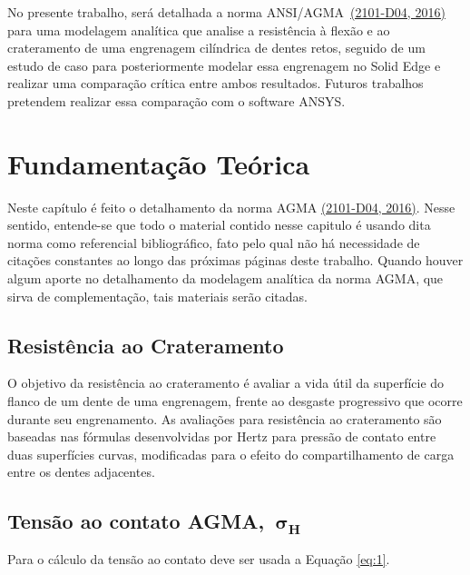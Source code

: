 \documentclass[12pt,a4paper]{article}
\begin{document}
No presente trabalho, será detalhada a norma
ANSI/AGMA~\hyperref[csl:5]{(2101-D04, 2016)} para uma modelagem analítica que analise a
resistência à flexão e ao crateramento de uma engrenagem cilíndrica de
dentes retos, seguido de um estudo de caso para posteriormente modelar
essa engrenagem no Solid Edge e realizar uma comparação crítica entre
ambos resultados. Futuros trabalhos pretendem realizar essa comparação
com o software ANSYS.

\section*{Fundamentação Teórica}

{\label{fundamentauxe7uxe3o-teuxf3rica}}

Neste capítulo é feito o detalhamento da norma AGMA \hyperref[csl:5]{(2101-D04, 2016)}.
Nesse sentido, entende-se que todo o material contido nesse capitulo é
usando dita norma como referencial bibliográfico, fato pelo qual não há
necessidade de citações constantes ao longo das próximas páginas deste
trabalho. Quando houver algum aporte no detalhamento da modelagem
analítica da norma AGMA, que sirva de complementação, tais materiais
serão citadas.

\subsection*{Resistência ao
Crateramento}

{\label{resistuxeancia-ao-crateramento}}

O objetivo da resistência ao crateramento é avaliar a vida útil da
superfície do flanco de um dente de uma engrenagem, frente ao desgaste
progressivo que ocorre durante seu engrenamento. As avaliações para
resistência ao crateramento são baseadas nas fórmulas desenvolvidas por
Hertz para pressão de contato entre duas superfícies curvas, modificadas
para o efeito do compartilhamento de carga entre os dentes adjacentes.

\subsection*{Tensão ao contato
AGMA,~\(\mathbf{\sigma}_{\mathbf{H}}\)}

{\label{tensuxe3o-ao-contato-agma-mathbfsigma_mathbfh}}

Para o cálculo da tensão ao contato deve ser usada a Equação {\ref{eq:1}}.
\par\null
\end{document}
